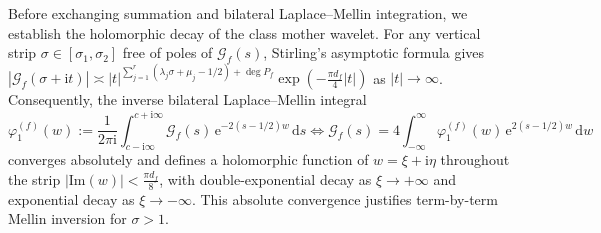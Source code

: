 \documentclass[11pt,reqno]{amsart}
\theoremstyle{definition}
\theoremstyle{remark}
\numberwithin{equation}{section}
\newcommand{\dd}{\mathrm{d}}
\newcommand{\ee}{\mathrm{e}}
\newcommand{\ii}{\mathrm{i}}
\newcommand{\Ima}{\mathrm{Im}}
\begin{document}
Before exchanging summation and bilateral Laplace--Mellin integration, we establish the holomorphic decay of the class mother wavelet. For any vertical strip $\sigma \in [\sigma_1, \sigma_2]$ free of poles of $\mathcal{G}_f(s)$, Stirling's asymptotic formula gives $|\mathcal{G}_f(\sigma + \ii t)| \asymp |t|^{\sum_{j=1}^r (\lambda_j\sigma + \mu_j - 1/2) + \deg P_f}\exp(-\frac{\pi d_f}{4}|t|)$ as $|t| \to \infty$. Consequently, the inverse bilateral Laplace--Mellin integral
\begin{equation}\label{eq:mother_wavelet_inv}
\varphi_1^{(f)}(w) := \frac{1}{2\pi\ii}\int_{c - \ii\infty}^{c + \ii\infty} \mathcal{G}_f(s)\,\ee^{-2(s - 1/2)w}\,\dd s \iff \mathcal{G}_f(s) = 4\int_{-\infty}^{\infty} \varphi_1^{(f)}(w)\,\ee^{2(s - 1/2)w}\,\dd w
\end{equation}
converges absolutely and defines a holomorphic function of $w = \xi + \ii\eta$ throughout the strip $|\Ima(w)| < \frac{\pi d_f}{8}$, with double-exponential decay as $\xi \to +\infty$ and exponential decay as $\xi \to -\infty$. This absolute convergence justifies term-by-term Mellin inversion for $\sigma > 1$.
\end{document}
